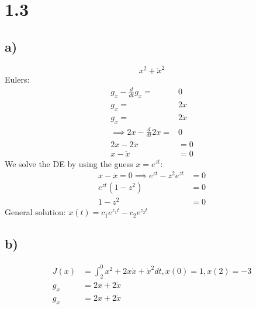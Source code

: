 \documentclass{article}
\begin{document}
\pagebreak
\section*{1.3}
\subsection*{a)}
	\begin{equation}
		x^2+\dot{x}^2
	\end{equation}
	Eulers: 
	\begin{align}
		g_x - \frac{d}{dt} g_{\dot{x}} =& 0\\
		g_x =& 2x \\
		g_{\dot{x}} =& 2\dot{x} \\
		\implies 2x - \frac{d}{dt} 2\dot{x} =& 0\\
		2x - 2\ddot{x} &= 0\\
		x - \ddot{x} &= 0
	\end{align}
	We solve the DE by using the guess $x = e^{z t}$:
	\begin{align}
		x - \ddot{x} = 0 \implies e^{z t} - z^2 e^{z t} &= 0 \\
		e^{z t}(1 - z^2) &= 0\\
		1 - z^2 &= 0
	\end{align}
	General solution: $x(t) = c_1 e^{z_1 t} - c_2 e^{z_2 t}$
\pagebreak
\subsection*{b)}
 \begin{align}
 	J(x) &= \int^0_2 x^2 +2x\dot{x} + \dot{x}^2 dt, x(0) = 1, x(2) = -3\\
 	g_x &= 2x +2\dot{x}\\
 	g_{\dot{x}} &= 2x +2\dot{x}	
 \end{align}
\end{document}
